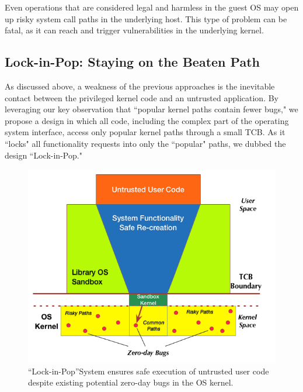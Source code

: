Even operations that are considered
legal and harmless in the guest OS may open up risky system call paths in the underlying
host. This type of problem can be fatal,
as it can reach and trigger vulnerabilities in the underlying kernel.

\subsection{Lock-in-Pop: Staying on the Beaten Path }
As discussed above, a weakness of the previous approaches is the inevitable contact
between the privileged kernel code and an untrusted application.
By leveraging our key observation
that ``popular kernel paths contain fewer bugs," we propose a design
in which all code, including the complex part
of the operating system interface, access only
popular kernel paths through a small TCB. As it ``locks" all functionality
requests into only the ``popular" paths, we dubbed the
design ``Lock-in-Pop."

\begin{figure}%
\centering
\includegraphics[width=.9\columnwidth]{diagram/Virtualization_Design_Model_01.png}
\caption{\small ``Lock-in-Pop''System ensures safe execution of untrusted user code
despite existing potential zero-day bugs in the OS kernel.}
\label{fig:design_safe_reimplementation}
\end{figure}

